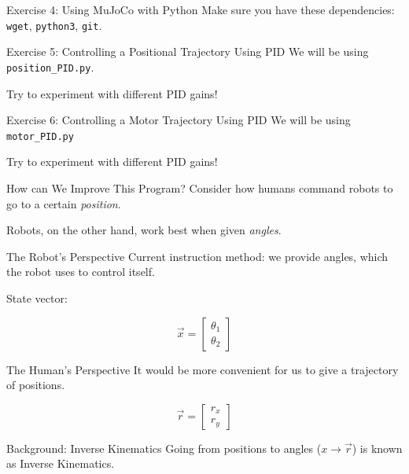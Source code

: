 \documentclass[14pt]{beamer}
\begin{document}
	\begin{frame}{Exercise 4: Using MuJoCo with Python}
		Make sure you have these dependencies: \texttt{wget}, \texttt{python3}, \texttt{git}.
	\end{frame}
	
	\begin{frame}{Exercise 5: Controlling a Positional Trajectory Using PID}
		We will be using \texttt{position\_PID.py}.
		
		\vspace{1cm}
		
		Try to experiment with different PID gains!
	\end{frame}
	
	\begin{frame}{Exercise 6: Controlling a Motor Trajectory Using PID}
		We will be using \texttt{motor\_PID.py}
		
		\vspace{1cm}
		
		Try to experiment with different PID gains!
	\end{frame}
	
	\begin{frame}{How can We Improve This Program?}
		Consider how humans command robots to go to a certain \emph{position}.
		
		\vspace{1cm}
		
		Robots, on the other hand, work best when given \emph{angles}.
	\end{frame}
	
	\begin{frame}{The Robot's Perspective}
		Current instruction method: we provide angles, which the robot uses to control itself.
		
		\vspace{1cm}
		
		State vector:
		
		$$\vec{x} = \begin{bmatrix}\theta_1 \\ \theta_2\end{bmatrix}$$
	\end{frame}
	
	\begin{frame}{The Human's Perspective}
		It would be more convenient for us to give a trajectory of positions.
		
		$$\vec{r}=\begin{bmatrix}r_x \\ r_y \end{bmatrix}$$
	\end{frame}
	
	\begin{frame}{Background: Inverse Kinematics}
		Going from positions to angles ($x \to\vec{r}$) is known as Inverse Kinematics.
	\end{frame}
\end{document}

